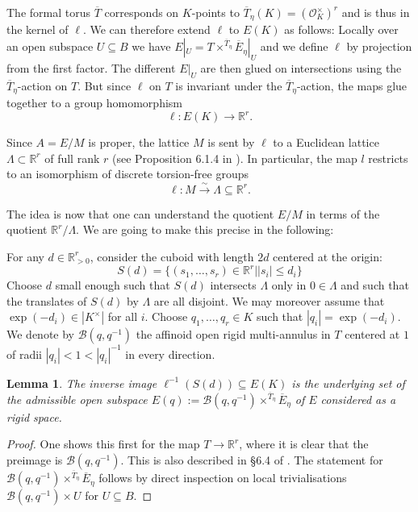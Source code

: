 \documentclass[10pt,oneside]{amsart}
\newtheorem{lemma}[theorem]{Lemma}
\theoremstyle{definition}
\begin{document}
		The formal torus $\overline{T}$ corresponds on $K$-points to $\overline{T}_\eta(K) = (\mathcal O_K^\times)^r$ and is thus in the kernel of $\ell$. We can therefore extend $\ell$ to $E(K)$ as follows: Locally over an open subspace $U\subseteq B$ we have $E|_U = T\times^{\overline{T}_\eta}\overline{E}_\eta|_{U}$ and we define $\ell$ by projection from the first factor. The different $E|_U$ are then glued on intersections using the $\overline{T}_\eta$-action on $T$. But since $\ell$ on $T$ is invariant under the $\overline{T}_\eta$-action, the maps glue together to a group homomorphism 
	\[\ell:E(K)\rightarrow \mathbb R^r.\]
	
	Since $A=E/M$ is proper, the lattice $M$ is sent by $\ell$ to a Euclidean lattice $\Lambda \subset \mathbb R^r$ of full rank $r$ (see Proposition 6.1.4 in \cite{rigid geometry of curves}). In particular, the map $l$ restricts to an isomorphism of discrete torsion-free groups
	\[\ell:M\xrightarrow{\sim} \Lambda\subseteq\mathbb R^r.\]
	
	The idea is now that one can understand the quotient $E/M$ in terms of the quotient $\mathbb R^r/\Lambda$. We are going to make this precise in the following:
	
	For any $d\in \mathbb R_{> 0}^r$, consider the cuboid with length $2d$ centered at the origin:
	\[S(d) = \{(s_1,\dots,s_r)\in \mathbb R^r | |s_i|\leq d_i \}\]
	Choose $d$ small enough such that $S(d)$ intersects $\Lambda$ only in $0\in \Lambda$ and such that the translates of $S(d)$ by $\Lambda$ are all disjoint. We may moreover assume that $\exp(-d_i)\in |K^\times|$ for all $i$. Choose
	 $q_1,\dots,q_r\in K$ such that $|q_i|=\exp(-d_i)$. We denote by $\mathcal B(q,q^{-1})$ the affinoid open rigid multi-annulus in $T$ centered at $1$ of radii $|q_i|< 1 < |q_i|^{-1}$ in every direction.
	
	\begin{lemma}\label{cube around origin gives local chart for E/M}
		The inverse image $\ell^{-1}(S(d))\subseteq E(K)$ is the underlying set of the admissible open subspace $E(q):=\mathcal B(q,q^{-1})\times^{\overline{T}_\eta}\overline{E}_\eta$ of $E$ considered as a rigid space.
	\end{lemma}
	\begin{proof}
		One shows this first for the map $T\rightarrow \mathbb R^r$, where it is clear that the preimage is $\mathcal B(q,q^{-1})$. This is also described in \S 6.4 of \cite{FvdP}. The statement for $\mathcal B(q,q^{-1})\times^{\overline{T}_\eta}\overline{E}_\eta$ follows by direct inspection on local trivialisations $\mathcal B(q,q^{-1})\times U$ for $U\subseteq B$.
	\end{proof}
	
\end{document}
